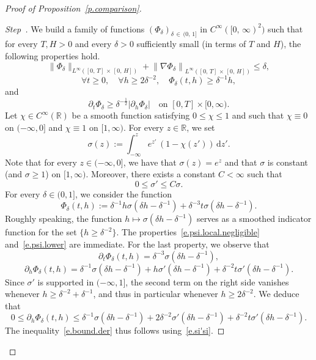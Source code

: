 \documentclass[10pt]{amsart}
\theoremstyle{definition}\newtheorem{defi}[theo]{Definition}\newtheorem{rema}[theo]{Remark}\newtheorem{exam}[theo]{Example}\newtheorem{exem}[theo]{Example}\newtheorem{nota}[theo]{Notation}
\newcommand{\R}{\mathbb{R}}
\renewcommand{\d}{\mathrm{d}}
\newcommand{\1}{\mathds{1}}
\renewcommand{\le}{\leqslant}
\renewcommand{\ge}{\geqslant}
\newcommand{\de}{\delta}
\newcommand{\si}{\sigma}
\newcounter{stepcount}
\newenvironment{step}{\refstepcounter{stepcount}\begin{proof}[Step~\thestepcount]}{\let\qed\relax\end{proof}}
\let\oldforall\forall
\renewcommand*{\forall}{\mathrel{\oldforall}}
\begin{document}
\begin{proof}[Proof of Proposition~\ref{p.comparison}]
\begin{step}\label{proofprop4.2Step0}
We build a family of functions $(\Phi_\de)_{\de\,\in\,(0,\,1]}$ in $C^\infty([0,\,\infty)^2)$ such that for every $T,H > 0$ and every $\delta > 0$ sufficiently small (in terms of $T$ and $H$), the following properties hold.
\begin{equation}\label{e.psi.local.negligible}
\|\Phi_\delta\|_{L^\infty\left([0,\,T]\,\times\,[0,\,H]\right)} + \left\|\nabla \Phi_\delta\right\|_{L^\infty\left([0,\,T]\,\times\, [0,\,H]\right)} \le \de,
\end{equation}
\begin{equation}\label{e.psi.lower}
\forall t\ge 0, \quad \forall h \ge 2 \delta^{-2}, \quad \Phi_\delta(t,h) \ge \delta^{-1} h,
\end{equation}
and
\begin{equation}\label{e.bound.der}
\partial_t \Phi_\delta \ge \delta^{-\frac 1 2} \left|\partial_h \Phi_\delta\right| \quad \text{on } [0,T] \times [0,\infty).
\end{equation}
Let $\chi \in C^\infty(\R)$ be a smooth function satisfying $0 \le \chi \le 1$ and such that $\chi \equiv 0$ on $(-\infty,0]$ and $\chi \equiv 1$ on $[1,\infty)$. For every $z \in \R$, we set
\[
\sigma(z) := \int_{-\infty}^z e^{z'} \, \left(1-\chi(z')\right) \, \d z'.
\]
Note that for every $z \in (-\infty,0]$, we have that $\sigma(z) = e^{z}$ and that $\sigma$ is constant (and $\sigma \ge 1$) on $[1,\infty)$. Moreover, there exists a constant $C < \infty$ such that
\begin{equation}\label{e.si'si}
0 \le \sigma' \le C \sigma.
\end{equation}
For every $\delta \in (0,1]$, we consider the function
\[
\Phi_\delta(t,h) := \delta^{-1} h \sigma\left(\delta h - \de^{-1}\right) +\delta^{-3} t \sigma\left(\de h - \de^{-1}\right).
\]
Roughly speaking, the function $h \mapsto \si(\de h - \de^{-1})$ serves as a smoothed indicator function for the set $\{h \ge \de^{-2}\}$. The properties~\eqref{e.psi.local.negligible} and~\eqref{e.psi.lower} are immediate. For the last property, we observe that
\[
\partial_t \Phi_\delta(t,h) = \de^{-3} \sigma\left(\de h - \de^{-1}\right),
\]
\[
\partial_h \Phi_\delta(t,h) = \delta^{-1} \sigma\left(\de h - \de^{-1}\right) + h \si'\left(\de h - \de^{-1}\right) + \de^{-2} t \si'\left(\de h - \de^{-1}\right).
\]
Since $\sigma'$ is supported in $(-\infty,1]$, the second term on the right side vanishes whenever $h \ge \de^{-2} + \de^{-1}$, and thus in particular whenever $h \ge 2 \de^{-2}$. We deduce that
\[
0 \le \partial_h \Phi_\delta(t,h) \le \delta^{-1} \sigma\left(\de h - \de^{-1}\right) + 2\de^{-2} \si'\left(\de h -\de^{-1}\right) + \de^{-2} t \si'\left(\de h - \de^{-1}\right).
\]
The inequality~\eqref{e.bound.der} thus follows using~\eqref{e.si'si}.
\end{step}


\end{proof}
\end{document}
